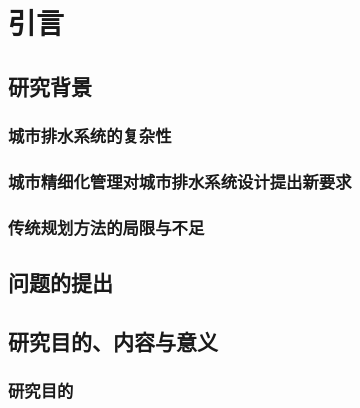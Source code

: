 \documentclass[degree=doctor]{thuthesis}
\begin{document}
\START


\frontmatter
\begin{abstract}
\end{abstract}

\clearpage
\setcounter{page}{2}
\begin{abstract*}
\end{abstract*}

\clearpage
\setcounter{page}{4}
\showoutput
\tableofcontents
\clearpage
\OMIT

\clearpage
\setcounter{page}{8}
\listoffiguresandtables

\clearpage
\setcounter{page}{9}
\begin{denotation}
  \item
\end{denotation}



\mainmatter
\chapter{引言}
\section{研究背景}
\subsection{城市排水系统的复杂性}

\clearpage
\setcounter{page}{4}
\subsection{城市精细化管理对城市排水系统设计提出新要求}

\clearpage
\setcounter{page}{6}
\subsection{传统规划方法的局限与不足}

\clearpage
\setcounter{page}{7}
\section{问题的提出}

\clearpage
\setcounter{page}{8}
\section{研究目的、内容与意义}
\subsection{研究目的}
\end{document}
